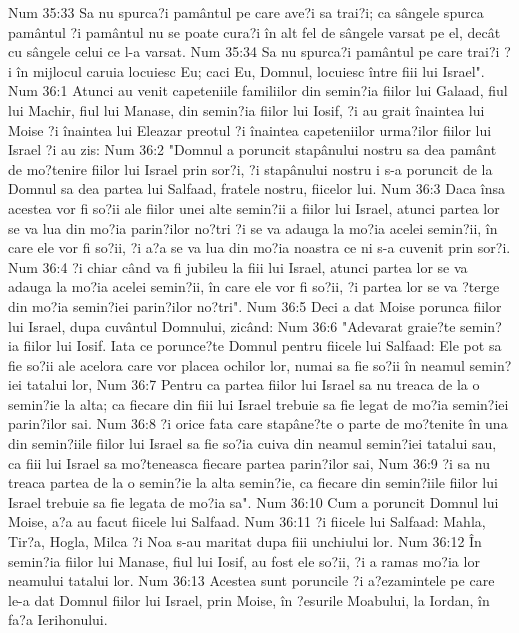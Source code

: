 Num 35:33  Sa nu spurca?i pamântul pe care ave?i sa trai?i; ca sângele spurca pamântul ?i pamântul nu se poate cura?i în alt fel de sângele varsat pe el, decât cu sângele celui ce l-a varsat.
Num 35:34  Sa nu spurca?i pamântul pe care trai?i ?i în mijlocul caruia locuiesc Eu; caci Eu, Domnul, locuiesc între fiii lui Israel".
Num 36:1  Atunci au venit capeteniile familiilor din semin?ia fiilor lui Galaad, fiul lui Machir, fiul lui Manase, din semin?ia fiilor lui Iosif, ?i au grait înaintea lui Moise ?i înaintea lui Eleazar preotul ?i înaintea capeteniilor urma?ilor fiilor lui Israel ?i au zis:
Num 36:2  "Domnul a poruncit stapânului nostru sa dea pamânt de mo?tenire fiilor lui Israel prin sor?i, ?i stapânului nostru i s-a poruncit de la Domnul sa dea partea lui Salfaad, fratele nostru, fiicelor lui.
Num 36:3  Daca însa acestea vor fi so?ii ale fiilor unei alte semin?ii a fiilor lui Israel, atunci partea lor se va lua din mo?ia parin?ilor no?tri ?i se va adauga la mo?ia acelei semin?ii, în care ele vor fi so?ii, ?i a?a se va lua din mo?ia noastra ce ni s-a cuvenit prin sor?i.
Num 36:4  ?i chiar când va fi jubileu la fiii lui Israel, atunci partea lor se va adauga la mo?ia acelei semin?ii, în care ele vor fi so?ii, ?i partea lor se va ?terge din mo?ia semin?iei parin?ilor no?tri".
Num 36:5  Deci a dat Moise porunca fiilor lui Israel, dupa cuvântul Domnului, zicând:
Num 36:6  "Adevarat graie?te semin?ia fiilor lui Iosif. Iata ce porunce?te Domnul pentru fiicele lui Salfaad: Ele pot sa fie so?ii ale acelora care vor placea ochilor lor, numai sa fie so?ii în neamul semin?iei tatalui lor,
Num 36:7  Pentru ca partea fiilor lui Israel sa nu treaca de la o semin?ie la alta; ca fiecare din fiii lui Israel trebuie sa fie legat de mo?ia semin?iei parin?ilor sai.
Num 36:8  ?i orice fata care stapâne?te o parte de mo?tenite în una din semin?iile fiilor lui Israel sa fie so?ia cuiva din neamul semin?iei tatalui sau, ca fiii lui Israel sa mo?teneasca fiecare partea parin?ilor sai,
Num 36:9  ?i sa nu treaca partea de la o semin?ie la alta semin?ie, ca fiecare din semin?iile fiilor lui Israel trebuie sa fie legata de mo?ia sa".
Num 36:10  Cum a poruncit Domnul lui Moise, a?a au facut fiicele lui Salfaad.
Num 36:11  ?i fiicele lui Salfaad: Mahla, Tir?a, Hogla, Milca ?i Noa s-au maritat dupa fiii unchiului lor.
Num 36:12  În semin?ia fiilor lui Manase, fiul lui Iosif, au fost ele so?ii, ?i a ramas mo?ia lor neamului tatalui lor.
Num 36:13  Acestea sunt poruncile ?i a?ezamintele pe care le-a dat Domnul fiilor lui Israel, prin Moise, în ?esurile Moabului, la Iordan, în fa?a Ierihonului.


